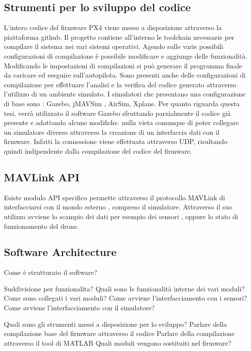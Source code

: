 \begin{it}
	\section{Strumenti per lo sviluppo del codice}
	L'intero codice del firmware PX4 viene messo a disposizione attraverso la piattaforma github. Il progetto contiene all'interno le toolchain necessarie per compilare il sistema nei vari sistemi operativi. Agendo sulle varie possibili configurazioni di compilazione è possibile modificare e aggiunge delle funzionalità. Modificando le impostazioni di compilazioni si può generare il programma finale da caricare ed eseguire sull'autopilota.
	Sono presenti anche delle configurazioni di compilazione per effettuare l'analisi e la verifica del codice generato attraverso l'utilizzo di un ambiente simulato. I simulatori che presentano una configurazione di base sono : Gazebo, jMAVSim , AirSim, Xplane. Per quanto riguarda questa tesi, verrà utilizzato il software Gazebo sfruttando parzialmente il codice già presente e adottando alcune modifiche. nulla vieta comunque di poter collegare un simulatore diverso attraverso la creazione di un interfaccia dati con il firmware. Infatti la connessione viene effettuata attraverso UDP, risultando quindi indipendente dalla compilazione del codice del firmware.
	\subsection{MAVLink API}
	Esiste modulo API specifico permette attraverso il protocollo MAVLink di interfacciarsi con il mondo esterno , compreso il simulatore. Attraverso il suo utilizzo avviene lo scampio dei dati per esempio dei sensori  , oppure lo stato di funzionamento del drone.
	
\end{it}

\begin{en}
	\section{Software Architecture}
	Come è strutturato il software?
	
	Suddivisione per funzionalita?
	Quali sono le funzionalità interne dei vari moduli?
	Come sono collegati i vari moduli?
	Come avviene l'interfacciamento con i sensori?
	Come avviene l'interfacciamento con il simulatore?
	
	Quali sono gli strumenti messi a disposizione per lo sviluppo?
	Parlare della compilazione base del firmware attraverso il codice
	Parlare della compilazione attraverso il tool di MATLAB 
	Quali moduli vengono sostituiti nel firmware?
\end{en}